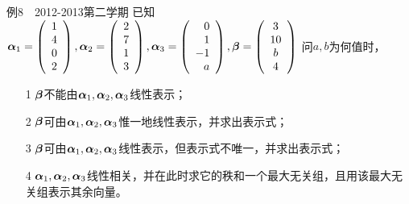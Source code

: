 \begin{frame}\ft{\subsecname}
  \begin{footnotesize}
    \begin{exampleblock}{例8~~2012-2013第二学期}
    已知$\boldsymbol{\alpha}_1=\left(
      \begin{array}{c}
        1\\4\\0\\2
      \end{array}
      \right),\boldsymbol{\alpha}_2=\left(
      \begin{array}{c}
        2\\7\\1\\3
      \end{array}
      \right),\boldsymbol{\alpha}_3=\left(
      \begin{array}{r}
        0\\1\\-1\\a
      \end{array}
      \right),\boldsymbol{\beta}=\left(
      \begin{array}{c}
        3\\10\\b\\4
      \end{array}
      \right)$
      问$a,b$为何值时，
      \begin{itemize}
      \item[1] $\boldsymbol{\beta}$不能由$\boldsymbol{\alpha}_1,\boldsymbol{\alpha}_2,\boldsymbol{\alpha}_3$线性表示；
      \item[2] $\boldsymbol{\beta}$可由$\boldsymbol{\alpha}_1,\boldsymbol{\alpha}_2,\boldsymbol{\alpha}_3$惟一地线性表示，并求出表示式；
      \item[3] $\boldsymbol{\beta}$可由$\boldsymbol{\alpha}_1,\boldsymbol{\alpha}_2,\boldsymbol{\alpha}_3$线性表示，但表示式不唯一，并求出表示式；
      \item[4] $\boldsymbol{\alpha}_1,\boldsymbol{\alpha}_2,\boldsymbol{\alpha}_3$线性相关，并在此时求它的秩和一个最大无关组，且用该最大无关组表示其余向量。
      \end{itemize}
    \end{exampleblock}

  \end{footnotesize}
\end{frame}








